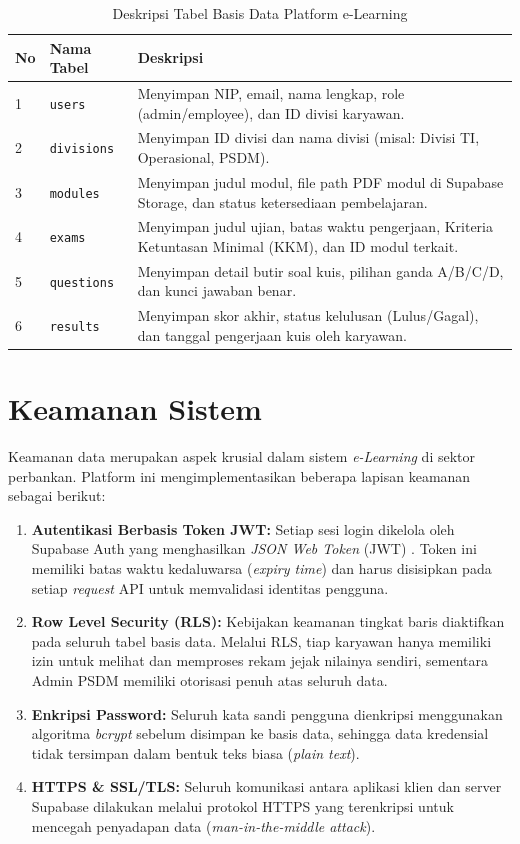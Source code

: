 \begin{table}[H]
\caption{Deskripsi Tabel Basis Data Platform e-Learning}
\label{tab:database}
\centering
\begin{tabular}{|p{0.8cm}|p{2.5cm}|p{11cm}|}
\hline
\textbf{No} & \textbf{Nama Tabel} & \textbf{Deskripsi} \\ \hline
1 & \texttt{users} & Menyimpan NIP, email, nama lengkap, role (admin/employee), dan ID divisi karyawan. \\ \hline
2 & \texttt{divisions} & Menyimpan ID divisi dan nama divisi (misal: Divisi TI, Operasional, PSDM). \\ \hline
3 & \texttt{modules} & Menyimpan judul modul, file path PDF modul di Supabase Storage, dan status ketersediaan pembelajaran. \\ \hline
4 & \texttt{exams} & Menyimpan judul ujian, batas waktu pengerjaan, Kriteria Ketuntasan Minimal (KKM), dan ID modul terkait. \\ \hline
5 & \texttt{questions} & Menyimpan detail butir soal kuis, pilihan ganda A/B/C/D, dan kunci jawaban benar. \\ \hline
6 & \texttt{results} & Menyimpan skor akhir, status kelulusan (Lulus/Gagal), dan tanggal pengerjaan kuis oleh karyawan. \\ \hline
\end{tabular}
\end{table}

\section{Keamanan Sistem}
Keamanan data merupakan aspek krusial dalam sistem \textit{e-Learning} di sektor perbankan. Platform ini mengimplementasikan beberapa lapisan keamanan sebagai berikut:

\begin{enumerate}
    \item \textbf{Autentikasi Berbasis Token JWT:} Setiap sesi login dikelola oleh Supabase Auth yang menghasilkan \textit{JSON Web Token} (JWT) \cite{jwt_security}. Token ini memiliki batas waktu kedaluwarsa (\textit{expiry time}) dan harus disisipkan pada setiap \textit{request} API untuk memvalidasi identitas pengguna.
    \item \textbf{Row Level Security (RLS):} Kebijakan keamanan tingkat baris diaktifkan pada seluruh tabel basis data. Melalui RLS, tiap karyawan hanya memiliki izin untuk melihat dan memproses rekam jejak nilainya sendiri, sementara Admin PSDM memiliki otorisasi penuh atas seluruh data.
    \item \textbf{Enkripsi Password:} Seluruh kata sandi pengguna dienkripsi menggunakan algoritma \textit{bcrypt} sebelum disimpan ke basis data, sehingga data kredensial tidak tersimpan dalam bentuk teks biasa (\textit{plain text}).
    \item \textbf{HTTPS \& SSL/TLS:} Seluruh komunikasi antara aplikasi klien dan server Supabase dilakukan melalui protokol HTTPS yang terenkripsi untuk mencegah penyadapan data (\textit{man-in-the-middle attack}).
\end{enumerate}
